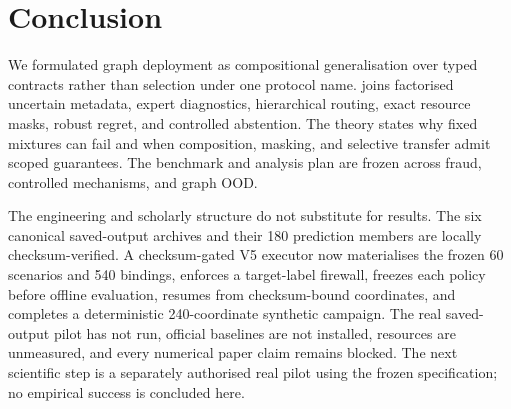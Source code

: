 \section{Conclusion}

We formulated graph deployment as compositional generalisation over typed contracts rather than selection under one protocol name. \method{} joins factorised uncertain metadata, expert diagnostics, hierarchical routing, exact resource masks, robust regret, and controlled abstention. The theory states why fixed mixtures can fail and when composition, masking, and selective transfer admit scoped guarantees. The benchmark and analysis plan are frozen across fraud, controlled mechanisms, and graph OOD.

The engineering and scholarly structure do not substitute for results. The six canonical saved-output archives and their 180 prediction members are locally checksum-verified. A checksum-gated V5 executor now materialises the frozen 60 scenarios and 540 bindings, enforces a target-label firewall, freezes each policy before offline evaluation, resumes from checksum-bound coordinates, and completes a deterministic 240-coordinate synthetic campaign. The real saved-output pilot has not run, official baselines are not installed, resources are unmeasured, and every numerical paper claim remains blocked. The next scientific step is a separately authorised real pilot using the frozen specification; no empirical success is concluded here.
